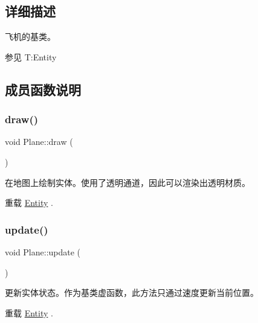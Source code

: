 \subsection{详细描述}
飞机的基类。 

\begin{DoxySeeAlso}{参见}
T\+:\+Entity


\end{DoxySeeAlso}


\subsection{成员函数说明}
\mbox{\label{class_plane_a8877358878e91929c4c01bad40cbdb78}} 
\subsubsection{\texorpdfstring{draw()}{draw()}}
{\footnotesize\ttfamily void Plane\+::draw (\begin{DoxyParamCaption}{ }\end{DoxyParamCaption})\hspace{0.3cm}{\ttfamily [virtual]}}



在地图上绘制实体。使用了透明通道，因此可以渲染出透明材质。 



重载 \hyperlink{class_entity_a7666f416dd0d1fce0f1133f78df44476}{Entity} .

\mbox{\label{class_plane_a7fbb07f76503fe057772e01f542afc32}} 
\subsubsection{\texorpdfstring{update()}{update()}}
{\footnotesize\ttfamily void Plane\+::update (\begin{DoxyParamCaption}{ }\end{DoxyParamCaption})\hspace{0.3cm}{\ttfamily [virtual]}}



更新实体状态。作为基类虚函数，此方法只通过速度更新当前位置。 



重载 \hyperlink{class_entity_a00b6eeaf99b35c8f8b10b5fbfc1baf4f}{Entity} .



